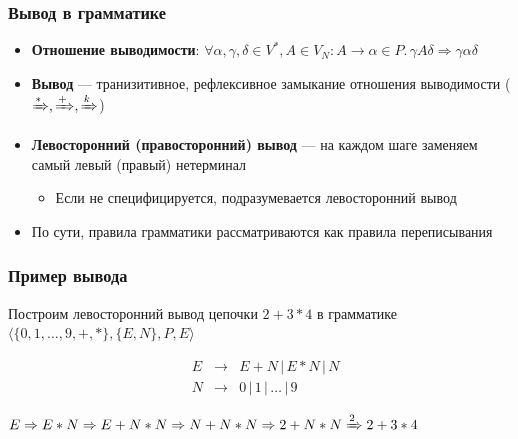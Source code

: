 \documentclass{beamer}
\begin{document}
\begin{frame}[fragile]
  \transwipe[direction=90]
  \frametitle{Вывод в грамматике}
  \begin{itemize}
    \item \textbf{Отношение выводимости}: $\forall \alpha, \gamma, \delta \in V^*, A \in V_N: A \rightarrow \alpha \in P. \, \gamma A \delta \Rightarrow \gamma \alpha \delta$
    \item \textbf{Вывод} --- транизитивное, рефлексивное замыкание отношения выводимости ($\xRightarrow[]{*}, \xRightarrow[]{+}, \xRightarrow[]{k}$)
    \item \textbf{Левосторонний (правосторонний) вывод} --- на каждом шаге заменяем самый левый (правый) нетерминал
    \begin{itemize}
      \item Если не специфицируется, подразумевается левосторонний вывод
    \end{itemize}
    \item По сути, правила грамматики рассматриваются как правила переписывания
  \end{itemize}
\end{frame}

\begin{frame}[fragile]
  \transwipe[direction=90]
  \frametitle{Пример вывода}
  Построим левосторонний вывод цепочки $2+3*4$ в грамматике $\langle \{ 0, 1, \dots, 9, +, *\}, \{E, N\}, P, E \rangle$
  
  $$
  \begin{array}{crcl}
  &E& \rightarrow & E + N \, | \, E * N \, | \, N \\
  &N& \rightarrow & 0 \, | \, 1  \, | \, \dots \, | \, 9
  \end{array}
  $$
  
$E \Rightarrow  E * N \Rightarrow E + N * N \Rightarrow N + N * N \Rightarrow 2 + N * N \xRightarrow[]{2} 2 + 3 * 4$
\end{frame}
\end{document}
